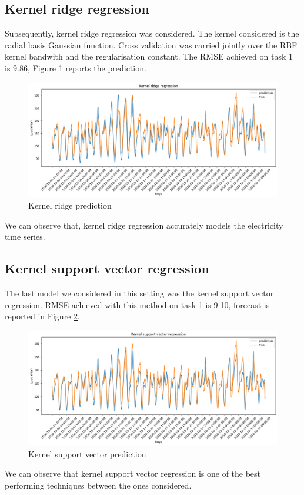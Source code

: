 \subsection{Kernel ridge regression}
Subsequently, kernel ridge regression was considered. The kernel considered is the radial basis Gaussian function.
Cross validation was carried jointly over the RBF kernel bandwith and the regularisation constant.
The RMSE achieved on task 1 is 9.86, Figure \ref{fig:krnridge_price} reports the prediction.
\begin{figure}[!ht]
    \includegraphics[width=\textwidth]{images/krnridge_price.png}
    \caption{Kernel ridge prediction}
    \label{fig:krnridge_price}
\end{figure}
We can observe that, kernel ridge regression accurately models the electricity time series.

\subsection{Kernel support vector regression}
The last model we considered in this setting was the kernel support vector regression.
RMSE achieved with this method on task 1 is 9.10, forecast is reported in Figure \ref{fig:krnsvr_price}.
\begin{figure}[!ht]
    \includegraphics[width=\textwidth]{images/krnsvr_price.png}
    \caption{Kernel support vector prediction}
    \label{fig:krnsvr_price}
\end{figure}
We can observe that kernel support vector regression is one of the best performing techniques between the ones considered.

